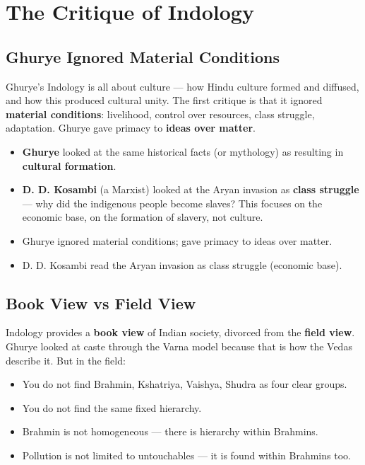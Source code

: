 \chapter{The Critique of Indology}

\section{Ghurye Ignored Material Conditions}

Ghurye's Indology is all about culture --- how Hindu culture formed and diffused, and how this produced cultural unity. The first critique is that it ignored \textbf{material conditions}: livelihood, control over resources, class struggle, adaptation. Ghurye gave primacy to \textbf{ideas over matter}.

\begin{ComparisonBox}
\begin{itemize}
\item \textbf{Ghurye} looked at the same historical facts (or mythology) as resulting in \textbf{cultural formation}.
\item \textbf{D. D. Kosambi} (a Marxist) looked at the Aryan invasion as \textbf{class struggle} --- why did the indigenous people become slaves? This focuses on the economic base, on the formation of slavery, not culture.
\end{itemize}
\end{ComparisonBox}

\begin{QuickRevision}
\begin{itemize}
\item Ghurye ignored material conditions; gave primacy to ideas over matter.
\item D. D. Kosambi read the Aryan invasion as class struggle (economic base).
\end{itemize}
\end{QuickRevision}

\section{Book View vs Field View}

Indology provides a \textbf{book view} of Indian society, divorced from the \textbf{field view}. Ghurye looked at caste through the Varna model because that is how the Vedas describe it. But in the field:
\begin{itemize}
\item You do not find Brahmin, Kshatriya, Vaishya, Shudra as four clear groups.
\item You do not find the same fixed hierarchy.
\item Brahmin is not homogeneous --- there is hierarchy within Brahmins.
\item Pollution is not limited to untouchables --- it is found within Brahmins too.
\end{itemize}

